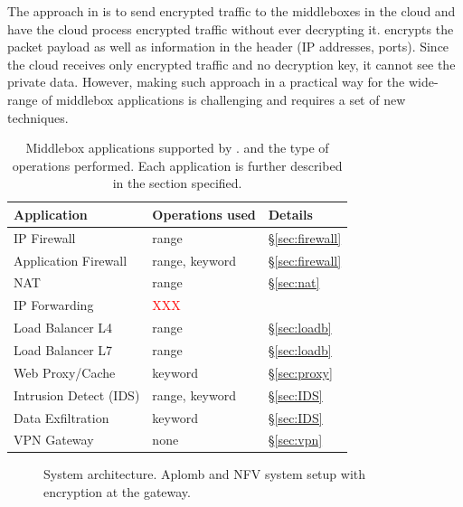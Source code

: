     The approach in \sys is to send encrypted traffic to the middleboxes in the cloud and have the cloud process encrypted traffic without ever decrypting it. \sys encrypts the packet payload as well as information in the header (IP addresses, ports). Since the cloud receives only encrypted traffic and no decryption key, it cannot see the private data. However, making such approach in a practical way for the wide-range of middlebox applications is challenging and requires a set of new techniques.
    
    
    
    
\begin{table}[t!]
\centering
\begin{tabular}{p{3.2cm}|p{3cm}|p{1cm}}
Application  & Operations used & Details \\
\hline \hline
IP Firewall &   range  & \S\ref{sec:firewall} \\
Application Firewall & range, keyword  & \S\ref{sec:firewall}\\
NAT & range  & \S\ref{sec:nat} \\
IP Forwarding  & \textcolor{red}{XXX} & \\
Load Balancer L4 & range & \S\ref{sec:loadb}\\
Load Balancer L7  & range & \S\ref{sec:loadb}\\
Web Proxy/Cache  & keyword & \S\ref{sec:proxy}\\
Intrusion Detect (IDS)  & range, keyword & \S\ref{sec:IDS}\\
Data Exfiltration  & keyword & \S\ref{sec:IDS} \\
VPN Gateway &  none & \S\ref{sec:vpn} \\ 
\end{tabular}
\caption{Middlebox applications supported by \sys. \label{tab:apps} and the type of operations performed. Each application is further described in the section specified. }
\end{table}


\begin{figure}[t!]
\centering
{}
%
\hfill  
{}
     
\caption{System architecture. Aplomb and NFV system setup with \sys encryption  at the gateway. \label{fig:sys-overview}}
\end{figure}

